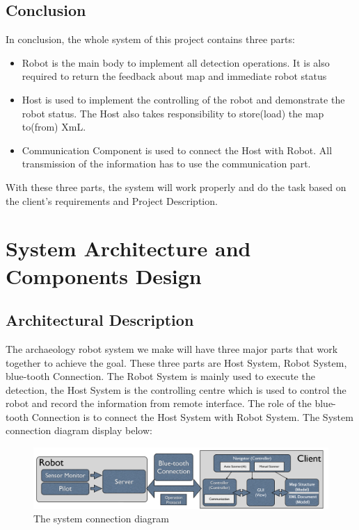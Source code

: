 \documentclass[11pt, a4paper]{report}
\begin{document}
\pagebreak
\section{Conclusion}
In conclusion, the whole system of this project contains three parts:
\begin{itemize}
  \item Robot is the main body to implement all detection operations. It is also required to return the feedback about map and immediate robot status 
  \item Host is used to implement the controlling of the robot and demonstrate the robot status. The Host also takes responsibility to store(load) the map to(from) XmL. 
  \item Communication Component is used to connect the Host with Robot. All transmission of the information has to use the communication part. 
\end{itemize}
With these three parts, the system will work properly and do the task based on the client's requirements and Project Description.



\pagebreak


\chapter{System Architecture and Components Design}%
\label{cha:SACD}


\section{Architectural Description}
The archaeology robot system we make will have three major parts that work together to achieve the goal. These three parts are Host System, Robot System, blue-tooth Connection. The Robot System is mainly used to execute the detection, the Host System is the controlling centre which is used to control the robot and record the information from remote interface. The role of the blue-tooth Connection is to connect the Host System with Robot System. The System connection diagram display below: 
\begin{figure}[h]
  \centering
    \includegraphics[width=16cm]{System.png}
  \caption{The system connection diagram}
\end{figure}
\end{document}
